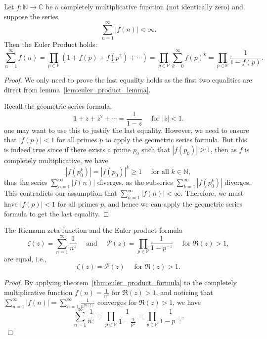 \documentclass{elegantbook}
\begin{document}
\begin{theorem} \label{thm:euler_product_formula}
  Let $f:\mathbb{N} \to \mathbb{C}$ be a completely multiplicative function (not identically zero) and suppose the series
  \[
    \sum_{n=1}^{\infty} |f(n)| < \infty.
  \]
  Then the Euler Product holds:
  \[
    \sum_{n=1}^{\infty} f(n) = \prod_{p\in\mathbb{P}} \left(1 + f(p) + f(p^2) + \cdots\right)=\prod_{p\in\mathbb{P}} \sum_{k=0}^{\infty} f(p)^k=\prod_{p\in\mathbb{P}} \frac{1}{1 - f(p)}.
  \]
\end{theorem}

\begin{proof}
  We only need to prove the last equality holds as the first two equalities are direct from lemma~\ref{lem:euler_product_lemma}.

  Recall the geometric series formula,
  \[
    1 + z + z^2 + \cdots = \frac{1}{1 - z} \quad \text{ for } |z| < 1.
  \]
  one may want to use this to justify the last equality. However, we need to ensure that $|f(p)| < 1$ for all primes $p$ to apply the geometric series formula. But this is indeed true since if there exists a prime $p_0$ such that $|f(p_0)| \geq 1$, then as $f$ is completely multiplicative, we have
  \[
    |f(p_0^k)| = |f(p_0)|^k \geq 1 \quad \text{ for all } k \in \mathbb{N},
  \]
  thus the series $\sum_{n=1}^{\infty} |f(n)|$ diverges, as the subseries $\sum_{k=1}^{\infty} |f(p_0^k)|$ diverges. This contradicts our assumption that $\sum_{n=1}^{\infty} |f(n)| < \infty$. Therefore, we must have $|f(p)| < 1$ for all primes $p$, and hence we can apply the geometric series formula to get the last equality.
\end{proof}

\begin{corollary} \label{cor:classical_euler_product_formula}
  The Riemann zeta function and the Euler product formula
  \[
    \zeta(z)=\sum_{n=1}^{\infty}\frac{1}{n^z} \quad \text{ and } \quad \mathcal{P}(z)=\prod_{p\in\mathbb{P}}\frac{1}{1-p^{-z}} \quad \text{ for } \Re(z)>1,
  \]
  are equal, i.e.,
  \[
    \zeta(z) = \mathcal{P}(z) \quad \text{ for } \Re(z)>1.
  \]
\end{corollary}

\begin{proof}
  By applying theorem~\ref{thm:euler_product_formula} to the completely multiplicative function $f(n) = \frac{1}{n^z}$ for $\Re(z)>1$, and noticing that $\sum_{n=1}^{\infty} |f(n)| = \sum_{n=1}^{\infty} \frac{1}{n^{\Re(z)}}$ converges for $\Re(z)>1$, we have
  \[
    \sum_{n=1}^{\infty} \frac{1}{n^z} = \prod_{p\in\mathbb{P}} \frac{1}{1 - \frac{1}{p^z}} = \prod_{p\in\mathbb{P}} \frac{1}{1 - p^{-z}}.
  \]
\end{proof}
\end{document}
